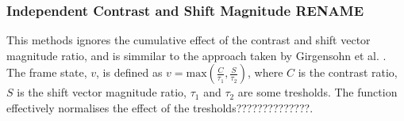 \subsubsection{Independent Contrast and Shift Magnitude RENAME}
%
This methods ignores the cumulative effect of the contrast and shift vector magnitude ratio, and is simmilar to the approach taken by Girgensohn et al. \cite{Girgensohn:2000:SAH:354401.354415}. The frame state, $v$, is defined as $v=\text{max}(\frac{C}{\tau_1}, \frac{S}{\tau_2})$,%
where $C$ is the contrast ratio, $S$ is the shift vector magnitude ratio, $\tau_1$ and $\tau_2$ are some tresholds.
The function effectively normalises the effect of the tresholds??????????????.%
%
